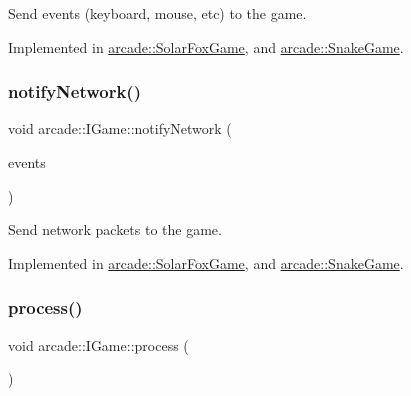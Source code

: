 Send events (keyboard, mouse, etc) to the game. 



Implemented in \hyperlink{classarcade_1_1_solar_fox_game_a12b4c225cad3913bb441a1b208c84bd7}{arcade\+::\+Solar\+Fox\+Game}, and \hyperlink{classarcade_1_1_snake_game_a93016697def74ebd53a76e33fbb0e583}{arcade\+::\+Snake\+Game}.

\mbox{\label{classarcade_1_1_i_game_aaf375290947abf3db32d966facbfacf3}} 
\subsubsection{\texorpdfstring{notify\+Network()}{notifyNetwork()}}
{\footnotesize\ttfamily void arcade\+::\+I\+Game\+::notify\+Network (\begin{DoxyParamCaption}\item[{std\+::vector$<$ \hyperlink{structarcade_1_1_network_packet}{Network\+Packet} $>$ \&\&}]{events }\end{DoxyParamCaption})\hspace{0.3cm}{\ttfamily [pure virtual]}}



Send network packets to the game. 



Implemented in \hyperlink{classarcade_1_1_solar_fox_game_ada83eb3dae2a14130fca4376f9274e5a}{arcade\+::\+Solar\+Fox\+Game}, and \hyperlink{classarcade_1_1_snake_game_a8b4a36ff6ce940d86894433e88bb50f5}{arcade\+::\+Snake\+Game}.

\mbox{\label{classarcade_1_1_i_game_af0111a41083f38a1af1a7f94287e6e77}} 
\subsubsection{\texorpdfstring{process()}{process()}}
{\footnotesize\ttfamily void arcade\+::\+I\+Game\+::process (\begin{DoxyParamCaption}{ }\end{DoxyParamCaption})\hspace{0.3cm}{\ttfamily [pure virtual]}}



